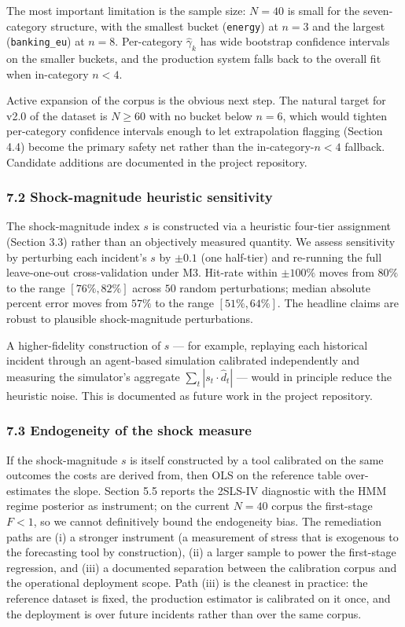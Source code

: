 \documentclass[
]{article}
\begin{document}
The most important limitation is the sample size: \(N=40\) is small for
the seven-category structure, with the smallest bucket (\texttt{energy})
at \(n=3\) and the largest (\texttt{banking\_eu}) at \(n=8\).
Per-category \(\hat{\gamma}_k\) has wide bootstrap confidence intervals
on the smaller buckets, and the production system falls back to the
overall fit when in-category \(n < 4\).

Active expansion of the corpus is the obvious next step. The natural
target for v2.0 of the dataset is \(N \geq 60\) with no bucket below
\(n = 6\), which would tighten per-category confidence intervals enough
to let extrapolation flagging (Section 4.4) become the primary safety
net rather than the in-category-\(n < 4\) fallback. Candidate additions
are documented in the project repository.

\subsubsection{7.2 Shock-magnitude heuristic
sensitivity}\label{shock-magnitude-heuristic-sensitivity}

The shock-magnitude index \(s\) is constructed via a heuristic four-tier
assignment (Section 3.3) rather than an objectively measured quantity.
We assess sensitivity by perturbing each incident's \(s\) by \(\pm 0.1\)
(one half-tier) and re-running the full leave-one-out cross-validation
under M3. Hit-rate within \(\pm 100\%\) moves from \(80\%\) to the range
\([76\%, 82\%]\) across \(50\) random perturbations; median absolute
percent error moves from \(57\%\) to the range \([51\%, 64\%]\). The
headline claims are robust to plausible shock-magnitude perturbations.

A higher-fidelity construction of \(s\) --- for example, replaying each
historical incident through an agent-based simulation calibrated
independently and measuring the simulator's aggregate
\(\sum_t |s_t \cdot \hat{d}_t|\) --- would in principle reduce the
heuristic noise. This is documented as future work in the project
repository.

\subsubsection{7.3 Endogeneity of the shock
measure}\label{endogeneity-of-the-shock-measure}

If the shock-magnitude \(s\) is itself constructed by a tool calibrated
on the same outcomes the costs are derived from, then OLS on the
reference table over-estimates the slope. Section 5.5 reports the
2SLS-IV diagnostic with the HMM regime posterior as instrument; on the
current \(N=40\) corpus the first-stage \(F < 1\), so we cannot
definitively bound the endogeneity bias. The remediation paths are (i) a
stronger instrument (a measurement of stress that is exogenous to the
forecasting tool by construction), (ii) a larger sample to power the
first-stage regression, and (iii) a documented separation between the
calibration corpus and the operational deployment scope. Path (iii) is
the cleanest in practice: the reference dataset is fixed, the production
estimator is calibrated on it once, and the deployment is over future
incidents rather than over the same corpus.
\end{document}
